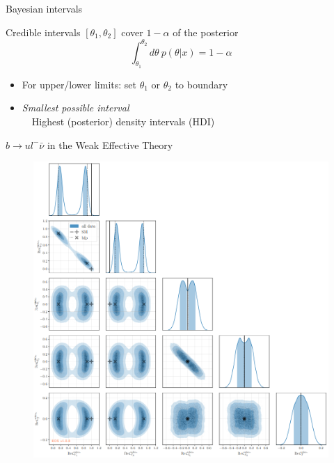 \documentclass[
aspectratio=169,
14pt,
professionalfonts
]{beamer}
\newcommand{\arrow}{~\ding{220}~}
\begin{document}
\begin{frame}{Bayesian intervals}

Credible intervals $[\theta_1, \theta_2]$ cover $1-\alpha$ of the posterior
$$
\int_{\theta_1}^{\theta_2} d\theta ~ p(\theta| x) = 1-\alpha
$$
\begin{itemize}
    \item For upper/lower limits: set $\theta_1$ or $\theta_2$ to boundary
    \item \textit{Smallest possible interval}\\
        \arrow Highest (posterior) density intervals (HDI)
\end{itemize}
\end{frame}

\begin{frame}{$b\to u l^- \bar \nu$ in the Weak Effective Theory}
    \vspace{-0.5cm}
    \begin{minipage}{0.5\textwidth}
        \begin{figure}
            \includegraphics[width=\textwidth]{../plots/wet-posterior.png}
        \end{figure}
    \end{minipage}
    \begin{minipage}{0.49\textwidth}
        \begin{itemize}

\end{itemize}
\end{minipage}
\end{frame}
\end{document}
